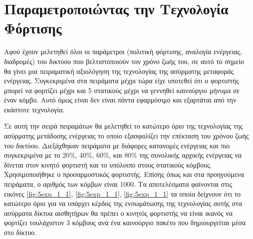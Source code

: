 \section{Παραμετροποιώντας την Τεχνολογία Φόρτισης}\label{sc:result5}
Αφού έχουν μελετηθεί όλοι οι παράμετροι (πολιτική φόρτισης, αναλογία ενέργειας, διαδρομές) του δικτύου που βελτιστοποιούν τον χρόνο ζωής του, σε αυτό το σημείο
θα γίνει μια πειραματική αξιολόγηση της τεχνολογίας της ασύρματης μεταφοράς ενέργειας. Συγκεκριμένα στα πειράματα μέχρι τώρα είχε υποτεθεί ότι ο φορτιστής μπορεί να
φορτίζει μέχρι και 5 στατικούς μέχρι να γεννηθεί καινούργιο μήνυμα σε έναν κόμβο. Αυτό όμως είναι δεν είναι πάντα εφαρμόσιμο και εξαρτάται από την εκάστοτε
τεχνολογία.

Σε αυτή την σειρά πειραμάτων θα μελετηθεί το κατώτερο όριο της τεχνολογίας της ασύρματης μετάδοσης ενέργειας το οποίο εξασφαλίζει την επέκταση του χρόνου
ζωής του δικτύου. Διεξάχθηκαν πειράματα με διάφορες κατανομές ενέργειας και πιο συγκεκριμένα με το 20\%, 40\%, 60\%, και 80\% της συνολικής αρχικής
ενέργειας να δίνεται στον κινητό φορτιστή και το υπόλοιπο στους στατικούς κόμβους. Χρησιμοποιήθηκε ο προσαρμοστικός φορτιστής. Επίσης όπως και στα προηγούμενα
πειράματα, ο αριθμός των κόμβων είναι 1000. Τα αποτελέσματα φαίνονται στις εικόνες \ref{fig:5exp_1_1},  \ref{fig:5exp_1_1},  \ref{fig:5exp_1_1} τα οποία δείχνουν ότι
το κατώτερο όριο για να υπάρχει κέρδος της ενσωμάτωσης της τεχνολογίας αυτής στα ασύρματα δίκτυα αισθητήρων θα πρέπει ο κινητός φορτιστής να είναι ικανός να φορτίζει
τουλάχιστον 3 κόμβους ανά ένα καινούργιο πακέτο που δημιουργείται μέσα στο δίκτυο.



